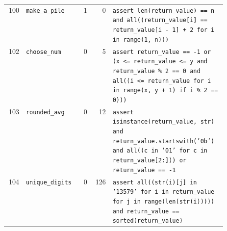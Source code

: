 \begin{footnotesize}
\begin{longtable}{@{}r l r r p{0.52\linewidth}@{}}
100 & \texttt{make\_a\_pile} & 1 & 0 & \texttt{assert \allowbreak{}len(\allowbreak{}return\_value)\allowbreak{} \allowbreak{}=\allowbreak{}=\allowbreak{} \allowbreak{}n \allowbreak{}and \allowbreak{}all(\allowbreak{}(\allowbreak{}return\_value[\allowbreak{}i]\allowbreak{} \allowbreak{}=\allowbreak{}=\allowbreak{} \allowbreak{}return\_value[\allowbreak{}i \allowbreak{}-\allowbreak{} \allowbreak{}1]\allowbreak{} \allowbreak{}+\allowbreak{} \allowbreak{}2 \allowbreak{}for \allowbreak{}i \allowbreak{}in \allowbreak{}range(\allowbreak{}1,\allowbreak{} \allowbreak{}n)\allowbreak{})\allowbreak{})\allowbreak{}} \\
102 & \texttt{choose\_num} & 0 & 5 & \texttt{assert \allowbreak{}return\_value \allowbreak{}=\allowbreak{}=\allowbreak{} \allowbreak{}-\allowbreak{}1 \allowbreak{}or \allowbreak{}(\allowbreak{}x \allowbreak{}<\allowbreak{}=\allowbreak{} \allowbreak{}return\_value \allowbreak{}<\allowbreak{}=\allowbreak{} \allowbreak{}y \allowbreak{}and \allowbreak{}return\_value \allowbreak{}\% \allowbreak{}2 \allowbreak{}=\allowbreak{}=\allowbreak{} \allowbreak{}0 \allowbreak{}and \allowbreak{}all(\allowbreak{}(\allowbreak{}i \allowbreak{}<\allowbreak{}=\allowbreak{} \allowbreak{}return\_value \allowbreak{}for \allowbreak{}i \allowbreak{}in \allowbreak{}range(\allowbreak{}x,\allowbreak{} \allowbreak{}y \allowbreak{}+\allowbreak{} \allowbreak{}1)\allowbreak{} \allowbreak{}if \allowbreak{}i \allowbreak{}\% \allowbreak{}2 \allowbreak{}=\allowbreak{}=\allowbreak{} \allowbreak{}0)\allowbreak{})\allowbreak{})\allowbreak{}} \\
103 & \texttt{rounded\_avg} & 0 & 12 & \texttt{assert \allowbreak{}isinstance(\allowbreak{}return\_value,\allowbreak{} \allowbreak{}str)\allowbreak{} \allowbreak{}and \allowbreak{}return\_value.\allowbreak{}startswith(\allowbreak{}'\allowbreak{}0b'\allowbreak{})\allowbreak{} \allowbreak{}and \allowbreak{}all(\allowbreak{}(\allowbreak{}c \allowbreak{}in \allowbreak{}'\allowbreak{}01'\allowbreak{} \allowbreak{}for \allowbreak{}c \allowbreak{}in \allowbreak{}return\_value[\allowbreak{}2:\allowbreak{}]\allowbreak{})\allowbreak{})\allowbreak{} \allowbreak{}or \allowbreak{}return\_value \allowbreak{}=\allowbreak{}=\allowbreak{} \allowbreak{}-\allowbreak{}1} \\
104 & \texttt{unique\_digits} & 0 & 126 & \texttt{assert \allowbreak{}all(\allowbreak{}(\allowbreak{}str(\allowbreak{}i)\allowbreak{}[\allowbreak{}j]\allowbreak{} \allowbreak{}in \allowbreak{}'\allowbreak{}13579'\allowbreak{} \allowbreak{}for \allowbreak{}i \allowbreak{}in \allowbreak{}return\_value \allowbreak{}for \allowbreak{}j \allowbreak{}in \allowbreak{}range(\allowbreak{}len(\allowbreak{}str(\allowbreak{}i)\allowbreak{})\allowbreak{})\allowbreak{})\allowbreak{})\allowbreak{} \allowbreak{}and \allowbreak{}return\_value \allowbreak{}=\allowbreak{}=\allowbreak{} \allowbreak{}sorted(\allowbreak{}return\_value)\allowbreak{}} \\

\end{longtable}
\end{footnotesize}
